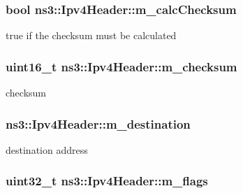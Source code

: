 \subsubsection[{\texorpdfstring{m\+\_\+calc\+Checksum}{m_calcChecksum}}]{\setlength{\rightskip}{0pt plus 5cm}bool ns3\+::\+Ipv4\+Header\+::m\+\_\+calc\+Checksum\hspace{0.3cm}{\ttfamily [private]}}\hypertarget{classns3_1_1Ipv4Header_afe50955aeda795cbe640f6e8e1626626}{}\label{classns3_1_1Ipv4Header_afe50955aeda795cbe640f6e8e1626626}


true if the checksum must be calculated 

\subsubsection[{\texorpdfstring{m\+\_\+checksum}{m_checksum}}]{\setlength{\rightskip}{0pt plus 5cm}uint16\+\_\+t ns3\+::\+Ipv4\+Header\+::m\+\_\+checksum\hspace{0.3cm}{\ttfamily [private]}}\hypertarget{classns3_1_1Ipv4Header_a9d1b68b18a491543fd34d5b233c5a22a}{}\label{classns3_1_1Ipv4Header_a9d1b68b18a491543fd34d5b233c5a22a}


checksum 

\subsubsection[{\texorpdfstring{m\+\_\+destination}{m_destination}}]{ ns3\+::\+Ipv4\+Header\+::m\+\_\+destination\hspace{0.3cm}{\ttfamily [private]}}\hypertarget{classns3_1_1Ipv4Header_a8953985e448341b24e4ac59bf50f4067}{}\label{classns3_1_1Ipv4Header_a8953985e448341b24e4ac59bf50f4067}


destination address 

\subsubsection[{\texorpdfstring{m\+\_\+flags}{m_flags}}]{\setlength{\rightskip}{0pt plus 5cm}uint32\+\_\+t ns3\+::\+Ipv4\+Header\+::m\+\_\+flags\hspace{0.3cm}{\ttfamily [private]}}\hypertarget{classns3_1_1Ipv4Header_ac43d5aa8e26e2d4cd4cf9520760f7638}{}\label{classns3_1_1Ipv4Header_ac43d5aa8e26e2d4cd4cf9520760f7638}


